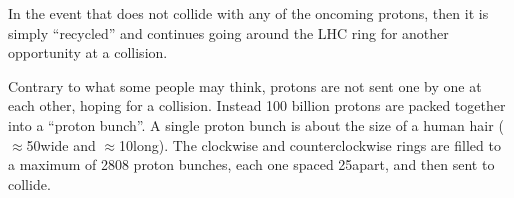 In the event that \pname does not collide with any of the oncoming protons, then it is simply ``recycled'' and continues going around the LHC ring for another opportunity at a \pp collision.




Contrary to what some people may think, protons are not sent one by one at each other, hoping for a collision.
Instead 100 billion protons are packed together into a ``proton bunch''.
A single proton bunch is about the size of a human hair ($\approx$50\mum wide and $\approx$10\cm long). 
The clockwise and counterclockwise rings are filled to a maximum of 2808 proton bunches, each one spaced 25\ns apart, and then sent to collide. 

